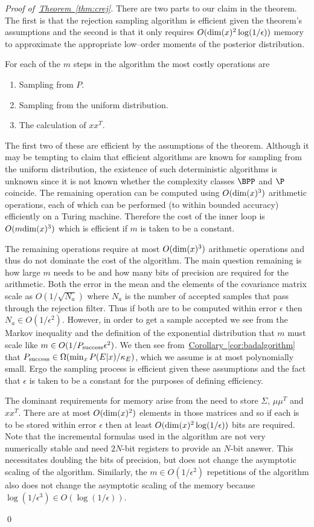\documentclass{article} %
\newenvironment{proofof}[1]{\begin{trivlist}\item[]{\flushleft\it
Proof of~#1.}}
{\qed\end{trivlist}}
\newcommand{\thm}[1]{\hyperref[thm:#1]{Theorem~\ref*{thm:#1}}}
\newcommand{\cor}[1]{\hyperref[cor:#1]{Corollary~\ref*{cor:#1}}}
\begin{document}
\begin{proofof}{\thm{crej}}
There are two parts to our claim in the theorem.  The first is that the rejection sampling algorithm is efficient given the theorem's assumptions
and the second is that it only requires $O({\rm dim}(x)^2 \log(1/\epsilon))$ memory to approximate the appropriate low--order moments of
 the posterior distribution.

For each of the $m$ steps in the algorithm the most costly operations are 
\begin{enumerate}
\item Sampling from $P$.
\item Sampling from the uniform distribution.
\item The calculation of $xx^T$.
\end{enumerate}
The first two of these are efficient by the assumptions of the theorem.  Although it may be tempting to claim that efficient algorithms are known
for sampling from the uniform distribution, the existence of such deterministic algorithms is unknown since it is not known whether the complexity
classes $\BPP$ and $\P$ coincide.  The remaining operation can be computed using $O({\rm dim}(x)^3)$ arithmetic operations, each of which can
be performed (to within bounded accuracy) efficiently on a Turing machine.  Therefore the cost of the inner loop is $O(m{\rm dim}(x)^3)$ which is efficient
if $m$ is taken to be a constant.

The remaining operations require at most $O({\rm dim}(x)^3)$ arithmetic operations and thus do not dominate the cost of the algorithm.  The main question remaining
is how large $m$ needs to be and how many bits of precision are required for the arithmetic.  Both the error in the mean and the elements of the covariance matrix scale as $O(1/\sqrt{N_a})$ where $N_a$ is the number of accepted samples that pass through the rejection filter.  Thus if both are to be computed within error $\epsilon$ then $N_a \in O(1/\epsilon^2)$.  However, in order to get a sample accepted we see from the Markov inequality and the definition of the exponential distribution that $m$ must scale like $m\in O(1/P_{\rm success} \epsilon^2)$.  We then see from~\cor{badalgorithm} that $P_{\rm success} \in \Omega(\min_x P(E|x)/\kappa_E)$, which we assume is at most polynomially small.  Ergo the sampling process is efficient given these assumptions and the fact that $\epsilon$ is taken to be a constant for the purposes of defining efficiency.

The dominant requirements for memory arise from the need to store $\Sigma$, $\mu\mu^T$ and $xx^T$.  There are at most $O({\rm dim}(x)^2)$ elements in those matrices and so if each is to be stored within error $\epsilon$ then at least $O({\rm dim}(x)^2\log(1/\epsilon))$ bits are required.  Note that the incremental formulas used in the algorithm are not very numerically stable and need $2N$-bit registers to provide an $N$-bit answer.  This necessitates doubling the bits of precision, but does not change the asymptotic scaling of the algorithm.  Similarly, the $m\in O(1/\epsilon^2)$ repetitions of the algorithm also does not change the asymptotic scaling of the memory because $\log(1/\epsilon^3) \in O(\log(1/\epsilon))$.


\end{proofof}
\end{document}
